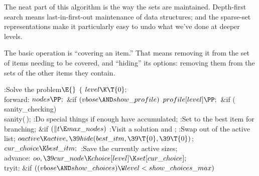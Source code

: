 The neat part of this algorithm is the way the sets are maintained.
Depth-first search means last-in-first-out maintenance of data structures;
and the sparse-set representations make it particularly easy to undo
what we've done at deeper levels.

The basic operation is ``covering an item.'' That means removing it
from the set of items needing to be covered, and ``hiding'' its
options: removing them from the sets of the other items they contain.

\Y\B\4:Solve the problem\X${}\E{}$\6
${}\{{}$\1\6
${}\\{level}\K\T{0};{}$\6
\4\\{forward}:\5
${}\\{nodes}\PP;{}$\6
\&{if} ${}(\\{vbose}\AND\\{show\_profile}){}$\1\5
${}\\{profile}[\\{level}]\PP;{}$\2\6
\&{if} (\\{sanity\_checking})\1\5
\\{sanity}(\,);\2\6
:Do special things if enough  have accumulated\X;\6
:Set  to the best item for branching\X;\6
\&{if} ${}(\|t\E\\{max\_nodes}){}$\1\5
:Visit a solution and \X;\2\6
:Swap  out of the active list\X;\6
${}\\{oactive}\K\\{active},\39\\{hide}(\\{best\_itm},\39\T{0},\39\T{0}){}$;\6
${}\\{cur\_choice}\K\\{best\_itm};{}$\6
:Save the currently active sizes\X;\6
\4\\{advance}:\5
${}\\{oo},\39\\{cur\_node}\K\\{choice}[\\{level}]\K\\{set}[\\{cur\_choice}];{}$%
\6
\4\\{tryit}:\5
\&{if} ${}((\\{vbose}\AND\\{show\_choices})\W\\{level}<\\{show\_choices%
\_max}){}$\5
